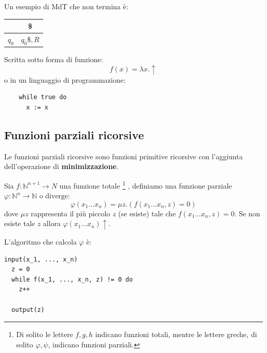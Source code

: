 \documentclass[a4paper]{article}
\begin{document}
\begin{example}
  Un esempio di MdT che non termina è:
  \begin{table}[H]
    \centering
    \begin{tabular}{|c|c|}
      \hline
      &  \$ \\
      \hline
      \( q_0 \) & \( q_0 \$, R \) \\
      \hline
    \end{tabular}
  \end{table}
  Scritta sotto forma di funzione:
  \[
    f(x) = \lambda x. \uparrow
  \] 
  o in un linguaggio di programmazione:
  \begin{lstlisting}
    while true do 
      x := x
  \end{lstlisting}
\end{example}

\subsection{Funzioni parziali ricorsive}
Le funzioni parziali ricorsive sono funzioni primitive ricorsive con l'aggiunta
dell'operazione di \textbf{minimizzazione}.

\begin{definition}[Minimizzazione]
  Sia \( f: \mathbb{N}^{n+1} \to N \) una funzione totale
  \footnote{Di solito le lettere \( f, g, h \) indicano funzioni totali, mentre le lettere
  greche, di solito \( \varphi, \psi \), indicano funzioni parziali.}
  , definiamo una funzione
  parziale \( \varphi: \mathbb{N}^n \to \mathbb{N} \text{ o diverge} \):
  \[
    \varphi(x_1 \ldots x_n) = \mu z. \left(f(x_1 \ldots x_n, z) = 0\right)
  \] 
  dove \( \mu z \) rappresenta il più piccolo \( z \) (se esiste) tale che
  \( f(x_1 \ldots x_n, z) = 0 \). Se non esiste tale \( z \) allora
  \( \varphi(x_1 \ldots x_n) \uparrow \).

  \vspace{1em}
  \noindent
  L'algoritmo che calcola \( \varphi \) è:
\begin{lstlisting}
input(x_1, ..., x_n)
  z = 0
  while f(x_1, ..., x_n, z) != 0 do
    z++

  output(z)
\end{lstlisting}
\end{definition}
\end{document}
